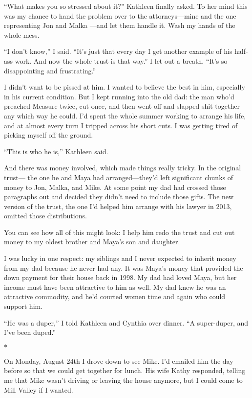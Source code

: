 \documentclass[12pt]{book}
\begin{document}
``What makes you so stressed about it?'' Kathleen finally asked. To her mind this was my chance to hand the problem over to the attorneys---mine and the one representing Jon and Malka ---and let them handle it. Wash my hands of the whole mess.

``I don't know,'' I said. ``It's just that every day I get another example of his half-ass work. And now the whole trust is that way.'' I let out a breath. ``It's so disappointing and frustrating.''

I didn't want to be pissed at him. I wanted to believe the best in him, especially in his current condition. But I kept running into the old dad: the man who'd preached Measure twice, cut once, and then went off and slapped shit together any which way he could. I'd spent the whole summer working to arrange his life, and at almost every turn I tripped across his short cuts. I was getting tired of picking myself off the ground.

``This is who he is,'' Kathleen said.

And there was money involved, which made things really tricky. In the original trust--- the one he and Maya had arranged---they'd left significant chunks of money to Jon, Malka, and Mike. At some point my dad had crossed those paragraphs out and decided they didn't need to include those gifts. The new version of the trust, the one I'd helped him arrange with his lawyer in 2013, omitted those distributions.

You can see how all of this might look: I help him redo the trust and cut out money to my oldest brother and Maya's son and daughter.

I was lucky in one respect: my siblings and I never expected to inherit money from my dad because he never had any. It was Maya's money that provided the down payment for their house back in 1998. My dad had loved Maya, but her income must have been attractive to him as well. My dad knew he was an attractive commodity, and he'd courted women time and again who could support him.

``He was a duper,'' I told Kathleen and Cynthia over dinner. ``A super-duper, and I've been duped.''

\begin{center}$*$\end{center}

On Monday, August 24th I drove down to see Mike. I'd emailed him the day before so that we could get together for lunch. His wife Kathy responded, telling me that Mike wasn't driving or leaving the house anymore, but I could come to Mill Valley if I wanted.
\end{document}
